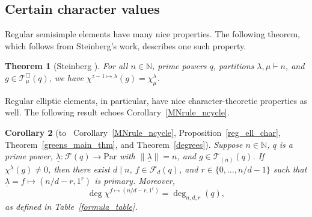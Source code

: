 \documentclass[10pt]{article}
\newtheorem{theorem}{Theorem}[section]
\newtheorem{corollary}[theorem]{Corollary}
\theoremstyle{definition}
\newcommand{\CF}{\mathcal{F}}
\newcommand{\N}{\mathbb{N}}
\newcommand{\CT}{\mathcal{T}}
\newcommand{\Par}{\text{Par}}
\newcommand{\ulambda}{{\underline{\lambda}}}
\begin{document}
\subsection{Certain character values}

Regular semisimple elements have many nice properties. The following theorem, which follows from Steinberg's work, describes one such property.
\begin{theorem}[Steinberg \cite{steinberg}]
\label{sn_stuff}
For all \(n \in \N\), prime powers \(q\), partitions \(\lambda, \mu \vdash n\), and \(g \in \CT_\mu^\Box (q)\), we have \(\chi^{z-1 \mapsto \lambda} (g) = \chi^\lambda_\mu\).
\end{theorem}

Regular elliptic elements, in particular, have nice character-theoretic properties as well.
The following result echoes Corollary~\ref{MNrule_ncycle}.
\begin{corollary}[to~
Corollary~\ref{MNrule_ncycle},
Proposition~\ref{reg_ell_char},
Theorem~\ref{greens_main_thm}, and
Theorem~\ref{degrees}]
\label{reg_ell_chi}
Suppose \(n \in \N\), \(q\) is a prime power, \(\ulambda : \CF(q) \to \Par\) with \(\|\ulambda\| = n\), and \(g \in \CT_{(n)} (q)\).
If \(\chi^\ulambda (g) \neq 0\), then there exist \(d \mid n\), \(f \in \CF_d (q)\), and \(r \in \{0,\ldots,n/d-1\}\) such that \(\ulambda = f \mapsto (n/d - r, 1^r)\) is primary.
Moreover,
\begin{equation}
\deg \chi^{f \mapsto (n/d-r,1^r)} = \deg_{n,d,r} (q),
\end{equation}
as defined in Table~\ref{formula_table}.
\end{corollary}
\end{document}
